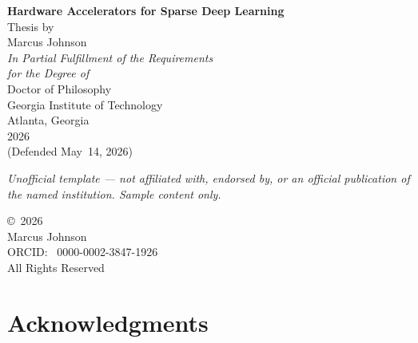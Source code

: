 \documentclass[11pt,twoside,openright]{book}
\begin{document}
\begin{titlepage}
\thispagestyle{empty}
\begin{center}

\vspace*{0.15\textheight}

{\Huge\bfseries Hardware Accelerators for Sparse Deep Learning}\\[36pt]

{\LARGE Thesis by}\\[18pt]

{\LARGE Marcus Johnson}\\[48pt]

{\large\textit{In Partial Fulfillment of the Requirements\\[4pt]
for the Degree of}}\\[18pt]

{\LARGE Doctor of Philosophy}\\[48pt]

{\large Georgia Institute of Technology}\\[6pt]
{\large Atlanta, Georgia}\\[30pt]

{\large 2026}\\[18pt]

{\normalsize\color{MidGray}(Defended May~14, 2026)}

\vfill
{\footnotesize\itshape Unofficial template --- not affiliated with, endorsed by, or an official publication of the named institution. Sample content only.}
\end{center}
\end{titlepage}

\cleardoublepage
\thispagestyle{empty}
\vspace*{0.4\textheight}

\begin{center}
{\large\copyright\ 2026}\\[12pt]
{\large Marcus Johnson}\\[12pt]
{\normalsize ORCID: \faOrcid\ 0000-0002-3847-1926}\\[24pt]
{\normalsize All Rights Reserved}
\end{center}

\cleardoublepage
\chapter*{Acknowledgments}
\end{document}
